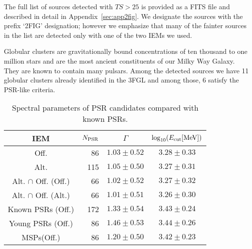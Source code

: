 \documentclass[iop]{emulateapj}
\newcommand{\newtext}[1]{{\color{blue}{#1}}}
\begin{document}

The full list of sources detected with $TS>25$ is provided as a FITS file and
described in detail in Appendix~\ref{sec:app2fig}.  We designate the sources with the prefix `2FIG'
designation; however we emphasize that many of the fainter sources in the
list are detected only with one of the two IEMs we used.  

Globular clusters are gravitationally bound concentrations of
ten thousand to one million stars and are the most ancient
constituents of our Milky Way Galaxy.  They are known to contain
many pulsars.  Among the detected sources we have
11 globular clusters already identified in the 3FGL and among those,
6 satisfy the PSR-like criteria.


\begin{table}[t]
\center
\begin{tabular}{crcc}
IEM & $N_{\rm{PSR}}$        & $\Gamma$       & $\log_{10}(E_{\rm{cut}} [\rm{MeV}])$   \\
\hline
Off.	&	86 &	$1.03\pm0.52$ &	$3.28\pm0.33$ \\
Alt.	&	115 &	$1.05\pm0.50$ &	$3.27\pm0.31$ \\
Alt. $\cap$ Off. (Off.) &	66 &	$1.02\pm0.52$ &	$3.27\pm0.32$ \\
Alt. $\cap$ Off. (Alt.) & 	66	& $1.01\pm0.51$ &	$3.26\pm0.30$ \\
Known PSRs (Off.) &	172	& $1.33\pm0.54$ &	$3.43\pm0.24$ \\
Young PSRs (Off.) &	86	& $1.46\pm0.53$ &	$3.44\pm0.26$ \\
MSPs(Off.) &	86	& $1.20\pm0.50$ &	$3.42\pm0.23$ \\
\end{tabular}
\caption{Spectral parameters of PSR candidates 
  compared with known PSRs.}
\label{tab:psrcandspectra}
\end{table}
\end{document}
